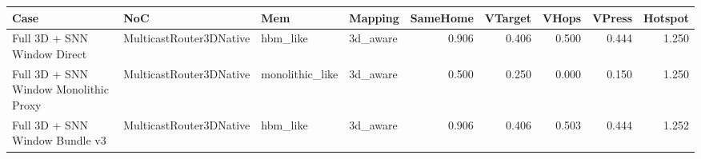 \begin{tabular}{l l l l r r r r r}
\hline
Case & NoC & Mem & Mapping & SameHome & VTarget & VHops & VPress & Hotspot \\
\hline
Full 3D + SNN Window Direct & MulticastRouter3DNative & hbm\_like & 3d\_aware & 0.906 & 0.406 & 0.500 & 0.444 & 1.250 \\
Full 3D + SNN Window Monolithic Proxy & MulticastRouter3DNative & monolithic\_like & 3d\_aware & 0.500 & 0.250 & 0.000 & 0.150 & 1.250 \\
Full 3D + SNN Window Bundle v3 & MulticastRouter3DNative & hbm\_like & 3d\_aware & 0.906 & 0.406 & 0.503 & 0.444 & 1.252 \\
\hline
\end{tabular}

